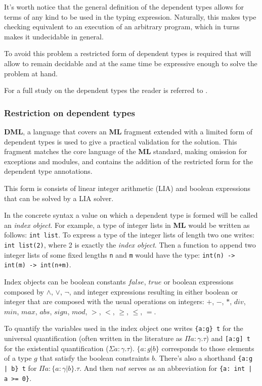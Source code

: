 \documentclass[a4paper,UKenglish]{lipics-v2016}
\begin{document}
It's worth notice that the general definition of the dependent types allows for
terms of any kind to be used in the typing expression. Naturally, this makes
type checking equivalent to an execution of an arbitrary program, which in
turns makes it undecidable in general.

To avoid this problem a restricted form of dependent types is required that
will allow to remain decidable and at the same time be expressive enough to
solve the problem at hand.

For a full study on the dependent types the reader is referred to
\cite{Hofmann97syntaxand}.

\subsubsection{Restriction on dependent types}

\textbf{DML}, a language that covers an \textbf{ML} fragment extended with a
limited form of dependent types is used to give a practical validation for the
solution. This fragment matches the core language of the \textbf{ML} standard,
making omission for exceptions and modules, and contains the addition of the
restricted form for the dependent type annotations.

This form is consists of linear integer arithmetic (LIA) and boolean
expressions that can be solved by a LIA solver.

In the concrete syntax a value on which a dependent type is formed will be
called an \emph{index object}. For example, a type of integer lists in
\textbf{ML} would be written as follows: \texttt{int list}. To express a type
of the integer lists of length two one writes: \texttt{int list(2)}, where 2 is
exactly the \emph{index object}. Then a function to append two integer lists of
some fixed lengths \texttt{n} and \texttt{m} would have the type:
\texttt{int(n) -> int(m) -> int(n+m)}.

Index objects can be boolean constants $false$, $true$ or boolean expressions
composed by $\land$, $\lor$, $\neg$, and integer expressions resulting in
either boolean or integer that are composed with the usual operations on
integers: $+$, $-$, $*$, $div$, $min$, $max$, $abs$, $sign$, $mod$, $>$, $<$,
$\ge$, $\le$, $=$.

To quantify the variables used in the index object one writes \texttt{\{a:g\}
t} for the universal quantification (often written in the literature as $\Pi a:
\gamma.  \tau$) and \texttt{[a:g] t} for the existential quantification
($\Sigma a: \gamma. \tau$).  $\{ a: g | b \}$ corresponds to those elements of
a type $g$ that satisfy the boolean constraints $b$. There's also a shorthand
\texttt{\{a:g | b\} t} for $\Pi a: \{a: \gamma | b\}. \tau$. And then $nat$
serves as an abbreviation for \texttt{\{a: int | a >= 0\}}.
\end{document}
